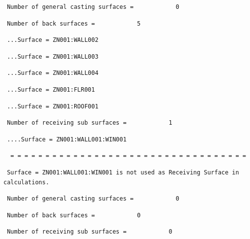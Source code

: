 \begin{lstlisting}
 Number of general casting surfaces =            0
\end{lstlisting}

\begin{lstlisting}
 Number of back surfaces =            5
\end{lstlisting}

\begin{lstlisting}
 ...Surface = ZN001:WALL002
\end{lstlisting}

\begin{lstlisting}
 ...Surface = ZN001:WALL003
\end{lstlisting}

\begin{lstlisting}
 ...Surface = ZN001:WALL004
\end{lstlisting}

\begin{lstlisting}
 ...Surface = ZN001:FLR001
\end{lstlisting}

\begin{lstlisting}
 ...Surface = ZN001:ROOF001
\end{lstlisting}

\begin{lstlisting}
 Number of receiving sub surfaces =            1
\end{lstlisting}

\begin{lstlisting}
 ....Surface = ZN001:WALL001:WIN001
\end{lstlisting}

\begin{lstlisting}
  = = = = = = = = = = = = = = = = = = = = = = = = = = = = = = = = = =
\end{lstlisting}

\begin{lstlisting}
 Surface = ZN001:WALL001:WIN001 is not used as Receiving Surface in calculations.
\end{lstlisting}

\begin{lstlisting}
 Number of general casting surfaces =            0
\end{lstlisting}

\begin{lstlisting}
 Number of back surfaces =            0
\end{lstlisting}

\begin{lstlisting}
 Number of receiving sub surfaces =            0
\end{lstlisting}

